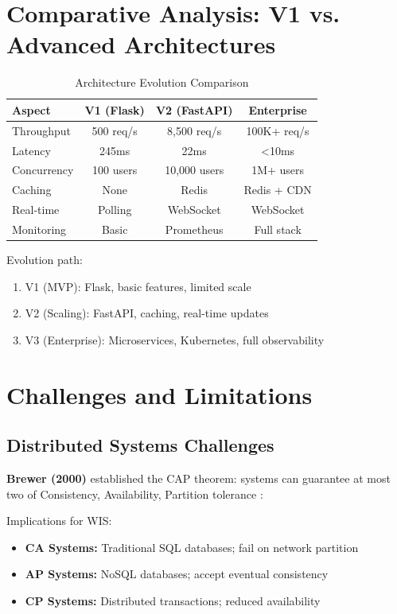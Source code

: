 \documentclass[conference]{IEEEtran}
\begin{document}
\begin{enumerate}
\section{Comparative Analysis: V1 vs. Advanced Architectures}

\begin{table}[h]
\centering
\caption{Architecture Evolution Comparison}
\begin{tabular}{|l|c|c|c|}
\hline
\textbf{Aspect} & \textbf{V1 (Flask)} & \textbf{V2 (FastAPI)} & \textbf{Enterprise} \\
\hline
Throughput & 500 req/s & 8,500 req/s & 100K+ req/s \\
Latency & 245ms & 22ms & <10ms \\
Concurrency & 100 users & 10,000 users & 1M+ users \\
Caching & None & Redis & Redis + CDN \\
Real-time & Polling & WebSocket & WebSocket \\
Monitoring & Basic & Prometheus & Full stack \\
\hline
\end{tabular}
\end{table}

Evolution path:
\begin{enumerate}
    \item V1 (MVP): Flask, basic features, limited scale
    \item V2 (Scaling): FastAPI, caching, real-time updates
    \item V3 (Enterprise): Microservices, Kubernetes, full observability
\end{enumerate}

\section{Challenges and Limitations}

\subsection{Distributed Systems Challenges}

\textbf{Brewer (2000)} established the CAP theorem: systems can guarantee at most two of Consistency, Availability, Partition tolerance \cite{brewer2000podc}:

Implications for WIS:
\begin{itemize}
    \item \textbf{CA Systems:} Traditional SQL databases; fail on network partition
    \item \textbf{AP Systems:} NoSQL databases; accept eventual consistency
    \item \textbf{CP Systems:} Distributed transactions; reduced availability
\end{itemize}


\end{enumerate}
\end{document}
